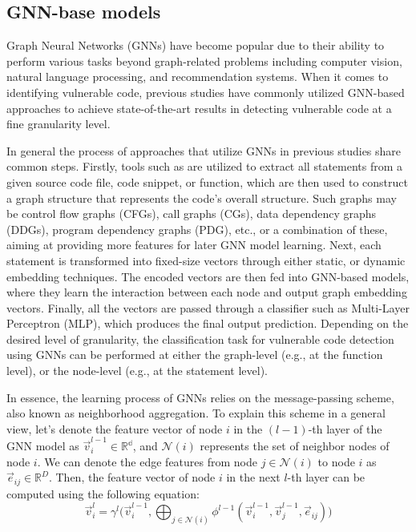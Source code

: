 \documentclass{ieeeaccess}
\begin{document}
\subsection{GNN-base models} \label{sec:graph_models}
\par Graph Neural Networks (GNNs) have become popular due to their ability to perform various tasks beyond graph-related problems including computer vision\cite{GNN_CV}, natural language processing\cite{GNN_NLP}, and recommendation systems\cite{GNN_Reccomend}. When it comes to identifying vulnerable code, previous studies have commonly utilized GNN-based approaches to achieve state-of-the-art results in detecting vulnerable code at a fine granularity level.
\par  In general the process of  approaches that utilize GNNs in previous studies share common steps. Firstly, tools such as \cite{c_tool1,c_tool2,ctool3,ctool4} are utilized to extract all statements from a given source code file, code snippet, or function, which are then used to construct a graph structure that represents the code's overall structure. Such graphs may be control flow graphs (CFGs), call graphs (CGs), data dependency graphs (DDGs), program dependency graphs (PDG), etc., or a combination of these, aiming at providing more features for later GNN model learning. Next, each statement is transformed into fixed-size vectors through either static\cite{doc2vec,word2vec, glove, fasttext}, or dynamic\cite{bert} embedding techniques. The encoded vectors are then fed into GNN-based models, where they learn the interaction between each node and output graph embedding vectors. Finally, all the vectors are passed through a classifier such as Multi-Layer Perceptron (MLP), which produces the final output prediction. Depending on the desired level of granularity, the classification task for vulnerable code detection using GNNs can be performed at either the graph-level\cite{devign, Are} (e.g., at the function level), or the node-level\cite{Linevd, IVDetect, MVD} (e.g., at the statement level). 
\par In essence, the learning process of GNNs relies on the message-passing scheme, also known as neighborhood aggregation\cite{message_passing}. To explain this scheme in a general view, let's denote the feature vector of node $i$ in the $(l-1)$-th layer of the GNN model as $\Vec{v}_i^{l-1}\in \mathbb{R^d}$, and $\mathcal{N}(i)$ represents the set of neighbor nodes of node $i$. We can denote the edge features from node $j\in \mathcal{N}(i)$ to node $i$ as $\Vec{e}_{ij} \in \mathbb{R}^D$. Then, the feature vector of node $i$ in the next $l$-th layer can be computed using the following equation:
\begin{equation} \label{equa:message_pass}
\Vec{v}^{l}_i = \gamma^{l} \bigg( \Vec{v}_i^{l-1} , \bigoplus_{j\in \mathcal{N}(i)} \phi^{l-1}(\Vec{v}_i^{l-1}, \Vec{v}_j^{l-1}, \Vec{e}_{ij})\bigg)
\end{equation}
\end{document}
